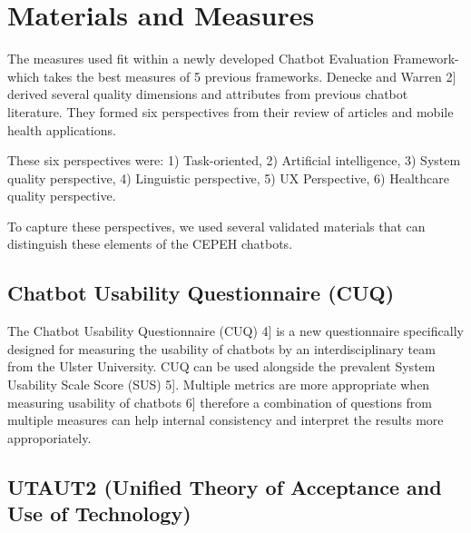 \documentclass[a4paper, nobind]{templates/ociamthesis}
\begin{document}
\hypertarget{materials-and-measures}{%
\section{Materials and Measures}\label{materials-and-measures}}

The measures used fit within a newly developed Chatbot Evaluation Framework- which takes the best measures of 5 previous frameworks.
Denecke and Warren \hspace{0pt}{[}2{]}\hspace{0pt} derived several quality dimensions and attributes from previous chatbot literature.
They formed six perspectives from their review of articles and mobile health applications.

These six perspectives were: 1) Task-oriented, 2) Artificial intelligence, 3) System quality perspective, 4) Linguistic perspective, 5) UX Perspective, 6) Healthcare quality perspective.

To capture these perspectives, we used several validated materials that can distinguish these elements of the CEPEH chatbots.

\hypertarget{chatbot-usability-questionnaire-cuq}{%
\subsection{Chatbot Usability Questionnaire (CUQ)}\label{chatbot-usability-questionnaire-cuq}}

The Chatbot Usability Questionnaire (CUQ) \hspace{0pt}{[}4{]}\hspace{0pt} is a new questionnaire specifically designed for measuring the usability of chatbots by an interdisciplinary team from the Ulster University.
CUQ can be used alongside the prevalent System Usability Scale Score (SUS) \hspace{0pt}{[}5{]}\hspace{0pt}.
Multiple metrics are more appropriate when measuring usability of chatbots \hspace{0pt}{[}6{]}\hspace{0pt} therefore a combination of questions from multiple measures can help internal consistency and interpret the results more approporiately.

\hypertarget{utaut2-unified-theory-of-acceptance-and-use-of-technology}{%
\subsection{UTAUT2 (Unified Theory of Acceptance and Use of Technology)}\label{utaut2-unified-theory-of-acceptance-and-use-of-technology}}
\end{document}
